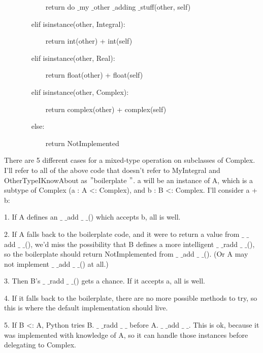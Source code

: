 ~~~~~~~~~~~ return do $  \_  $my $  \_  $other $  \_  $adding $  \_  $stuff(other, self) \par
~~~~~~~ elif isinstance(other, Integral): \par
~~~~~~~~~~~ return int(other) + int(self) \par
~~~~~~~ elif isinstance(other, Real): \par
~~~~~~~~~~~ return float(other) + float(self) \par
~~~~~~~ elif isinstance(other, Complex): \par
~~~~~~~~~~~ return complex(other) + complex(self) \par
~~~~~~~ else: \par
~~~~~~~~~~~ return NotImplemented \par
There are 5 different cases for a mixed-type operation on subclasses of Complex. I’ll refer to all of the above code that doesn’t refer to MyIntegral and OtherTypeIKnowAbout as  $ " $boilerplate $ " $. a will be an instance of A, which is a subtype of Complex (a : A <: Complex), and b : B <: Complex. I’ll consider a + b: \par
1. \hspace*{0.5in} If A defines an  $  \_  $ $  \_  $add $  \_  $ $  \_  $() which accepts b, all is well. \par
2. \hspace*{0.5in} If A falls back to the boilerplate code, and it were to return a value from  $  \_  $ $  \_  $add $  \_  $ $  \_  $(), we’d miss the possibility that B defines a more intelligent  $  \_  $ $  \_  $radd $  \_  $ $  \_  $(), so the boilerplate should return NotImplemented from  $  \_  $ $  \_  $add $  \_  $ $  \_  $(). (Or A may not implement  $  \_  $ $  \_  $add $  \_  $ $  \_  $() at all.) \par
3. \hspace*{0.5in} Then B’s  $  \_  $ $  \_  $radd $  \_  $ $  \_  $() gets a chance. If it accepts a, all is well. \par
4. \hspace*{0.5in} If it falls back to the boilerplate, there are no more possible methods to try, so this is where the default implementation should live. \par
5. \hspace*{0.5in} If B <: A, Python tries B. $  \_  $ $  \_  $radd $  \_  $ $  \_  $ before A. $  \_  $ $  \_  $add $  \_  $ $  \_  $. This is ok, because it was implemented with knowledge of A, so it can handle those instances before delegating to Complex. \par
